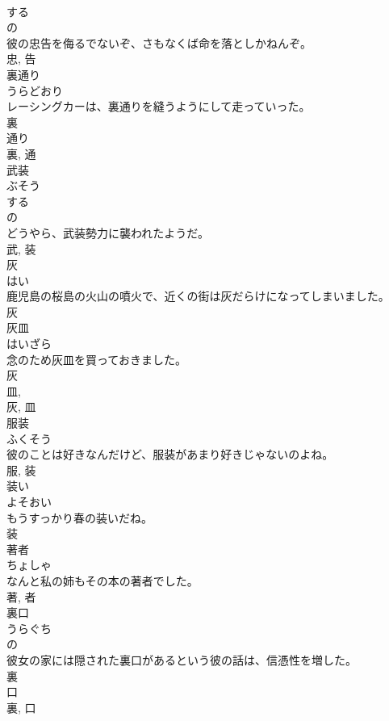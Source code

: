 \documentclass[8pt]{extreport}
\begin{document}
\begin{CJK}{UTF8}{min}
\\	する 
\\	の 
\\	彼の忠告を侮るでないぞ、さもなくば命を落としかねんぞ。	
\\	忠, 告	
\\	裏通り	
\\	うらどおり	
\\	レーシングカーは、裏通りを縫うようにして走っていった。	
\\	裏 
\\	通り 
\\	裏, 通	
\\	武装	
\\	ぶそう	
\\	する 
\\	の 
\\	どうやら、武装勢力に襲われたようだ。	
\\	武, 装	
\\	灰	
\\	はい	
\\	鹿児島の桜島の火山の噴火で、近くの街は灰だらけになってしまいました。	
\\	灰	
\\	灰皿	
\\	はいざら	
\\	念のため灰皿を買っておきました。	
\\	灰 
\\	皿, 
\\	灰, 皿	
\\	服装	
\\	ふくそう	
\\	彼のことは好きなんだけど、服装があまり好きじゃないのよね。	
\\	服, 装	
\\	装い	
\\	よそおい	
\\	もうすっかり春の装いだね。	
\\	装	
\\	著者	
\\	ちょしゃ	
\\	なんと私の姉もその本の著者でした。	
\\	著, 者	
\\	裏口	
\\	うらぐち	
\\	の 
\\	彼女の家には隠された裏口があるという彼の話は、信憑性を増した。	
\\	裏 
\\	口 
\\	裏, 口	

\end{CJK}
\end{document}

